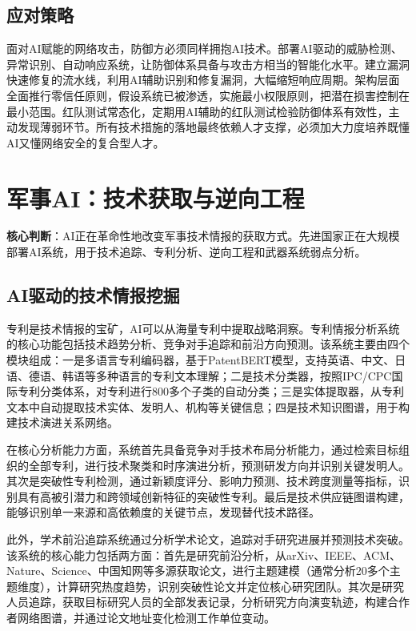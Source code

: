\subsection{应对策略}

面对AI赋能的网络攻击，防御方必须同样拥抱AI技术。部署AI驱动的威胁检测、异常识别、自动响应系统，让防御体系具备与攻击方相当的智能化水平。建立漏洞快速修复的流水线，利用AI辅助识别和修复漏洞，大幅缩短响应周期。架构层面全面推行零信任原则，假设系统已被渗透，实施最小权限原则，把潜在损害控制在最小范围。红队测试常态化，定期用AI辅助的红队测试检验防御体系有效性，主动发现薄弱环节。所有技术措施的落地最终依赖人才支撑，必须加大力度培养既懂AI又懂网络安全的复合型人才。


\section{军事AI：技术获取与逆向工程}

\textbf{核心判断}：AI正在革命性地改变军事技术情报的获取方式。先进国家正在大规模部署AI系统，用于技术追踪、专利分析、逆向工程和武器系统弱点分析。

\subsection{AI驱动的技术情报挖掘}

专利是技术情报的宝矿，AI可以从海量专利中提取战略洞察。专利情报分析系统的核心功能包括技术趋势分析、竞争对手追踪和前沿方向预测。该系统主要由四个模块组成：一是多语言专利编码器，基于PatentBERT模型，支持英语、中文、日语、德语、韩语等多种语言的专利文本理解；二是技术分类器，按照IPC/CPC国际专利分类体系，对专利进行800多个子类的自动分类；三是实体提取器，从专利文本中自动提取技术实体、发明人、机构等关键信息；四是技术知识图谱，用于构建技术演进关系网络。

在核心分析能力方面，系统首先具备竞争对手技术布局分析能力，通过检索目标组织的全部专利，进行技术聚类和时序演进分析，预测研发方向并识别关键发明人。其次是突破性专利检测，通过新颖度评分、影响力预测、技术跨度测量等指标，识别具有高被引潜力和跨领域创新特征的突破性专利。最后是技术供应链图谱构建，能够识别单一来源和高依赖度的关键节点，发现替代技术路径。

此外，学术前沿追踪系统通过分析学术论文，追踪对手研究进展并预测技术突破。该系统的核心能力包括两方面：首先是研究前沿分析，从arXiv、IEEE、ACM、Nature、Science、中国知网等多源获取论文，进行主题建模（通常分析20多个主题维度），计算研究热度趋势，识别突破性论文并定位核心研究团队。其次是研究人员追踪，获取目标研究人员的全部发表记录，分析研究方向演变轨迹，构建合作者网络图谱，并通过论文地址变化检测工作单位变动。

